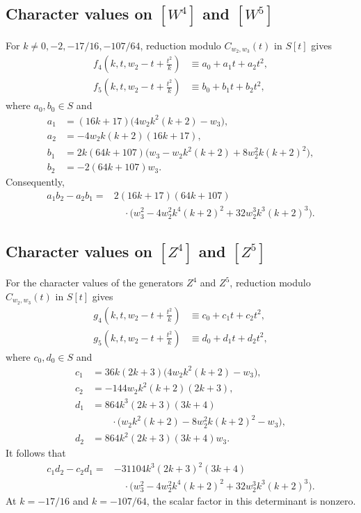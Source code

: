 \documentclass[11 pt]{amsart}
\theoremstyle{definition}
\theoremstyle{plain}
\begin{document}
\subsection*{Character values on $[W^4]$ and $[W^5]$}

For $k\neq0,-2,-17/16,-107/64$, reduction modulo
$C_{w_2,w_3}(t)$ in $S[t]$ gives
\begin{align*}
f_4\left(k,t,w_2-t+\frac{t^2}{k}\right)
&\equiv a_0+a_1t+a_2t^2,\\
f_5\left(k,t,w_2-t+\frac{t^2}{k}\right)
&\equiv b_0+b_1t+b_2t^2,
\end{align*}
where $a_0,b_0\in S$ and
\begin{align*}
a_1&=(16k+17)\bigl(4w_2k^2(k+2)-w_3\bigr),\\
a_2&=-4w_2k(k+2)(16k+17),\\
b_1&=2k(64k+107)
\bigl(w_3-w_2k^2(k+2)+8w_2^2k(k+2)^2\bigr),\\
b_2&=-2(64k+107)w_3.
\end{align*}
Consequently,
\[
\begin{aligned}
a_1b_2-a_2b_1
={}&2(16k+17)(64k+107)\\
&\quad\cdot
\bigl(w_3^2-4w_2^2k^4(k+2)^2
+32w_2^3k^3(k+2)^3\bigr).
\end{aligned}
\]

\subsection*{Character values on $[Z^4]$ and $[Z^5]$}

For the character values of the generators $Z^4$ and $Z^5$, reduction
modulo $C_{w_2,w_3}(t)$ in $S[t]$ gives
\begin{align*}
g_4\left(k,t,w_2-t+\frac{t^2}{k}\right)
&\equiv c_0+c_1t+c_2t^2,\\
g_5\left(k,t,w_2-t+\frac{t^2}{k}\right)
&\equiv d_0+d_1t+d_2t^2,
\end{align*}
where $c_0,d_0\in S$ and
\begin{align*}
c_1&=36k(2k+3)\bigl(4w_2k^2(k+2)-w_3\bigr),\\
c_2&=-144w_2k^2(k+2)(2k+3),\\
d_1&=864k^3(2k+3)(3k+4)\\
&\qquad\cdot
\bigl(w_2k^2(k+2)-8w_2^2k(k+2)^2-w_3\bigr),\\
d_2&=864k^2(2k+3)(3k+4)w_3.
\end{align*}
It follows that
\[
\begin{aligned}
c_1d_2-c_2d_1
={}&-31104k^3(2k+3)^2(3k+4)\\
&\quad\cdot
\bigl(w_3^2-4w_2^2k^4(k+2)^2
+32w_2^3k^3(k+2)^3\bigr).
\end{aligned}
\]
At $k=-17/16$ and $k=-107/64$, the scalar factor in this determinant
is nonzero.
\end{document}
